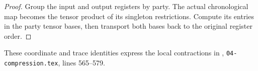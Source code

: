 \begin{proof}\leanok
    Group the input and output registers by party. The actual
    chronological map becomes the tensor product of its singleton
    restrictions. Compute its entries in the party tensor bases,
    then transport both bases back to the original register order.
\end{proof}

These coordinate and trace identities express the local contractions in
\cite[proof of Theorem~5.2]{OpenAI2026PolynomialPEPS},
\texttt{04-compression.tex}, lines 565--579.
